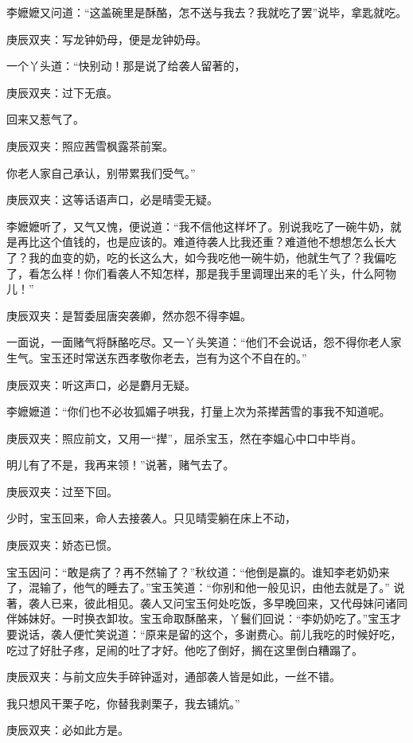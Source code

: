 \begin{parag}
    李嬷嬷又问道：“这盖碗里是酥酪，怎不送与我去？我就吃了罢”说毕，拿匙就吃。\begin{note}庚辰双夹：写龙钟奶母，便是龙钟奶母。\end{note}一个丫头道：“快别动！那是说了给袭人留著的，\begin{note}庚辰双夹：过下无痕。\end{note}回来又惹气了。\begin{note}庚辰双夹：照应茜雪枫露茶前案。\end{note}你老人家自己承认，别带累我们受气。”\begin{note}庚辰双夹：这等话语声口，必是晴雯无疑。\end{note}李嬷嬷听了，又气又愧，便说道：“我不信他这样坏了。别说我吃了一碗牛奶，就是再比这个值钱的，也是应该的。难道待袭人比我还重？难道他不想想怎么长大了？我的血变的奶，吃的长这么大，如今我吃他一碗牛奶，他就生气了？我偏吃了，看怎么样！你们看袭人不知怎样，那是我手里调理出来的毛丫头，什么阿物儿！”\begin{note}庚辰双夹：是暂委屈唐突袭卿，然亦怨不得李媪。\end{note}一面说，一面赌气将酥酪吃尽。又一丫头笑道：“他们不会说话，怨不得你老人家生气。宝玉还时常送东西孝敬你老去，岂有为这个不自在的。”\begin{note}庚辰双夹：听这声口，必是麝月无疑。\end{note}李嬷嬷道：“你们也不必妆狐媚子哄我，打量上次为茶撵茜雪的事我不知道呢。\begin{note}庚辰双夹：照应前文，又用一“撵”，屈杀宝玉，然在李媪心中口中毕肖。\end{note}明儿有了不是，我再来领！”说著，赌气去了。\begin{note}庚辰双夹：过至下回。\end{note}
\end{parag}


\begin{parag}
    少时，宝玉回来，命人去接袭人。只见晴雯躺在床上不动，\begin{note}庚辰双夹：娇态已惯。\end{note}宝玉因问：“敢是病了？再不然输了？”秋纹道：“他倒是赢的。谁知李老奶奶来了，混输了，他气的睡去了。”宝玉笑道：“你别和他一般见识，由他去就是了。” 说著，袭人已来，彼此相见。袭人又问宝玉何处吃饭，多早晚回来，又代母妹问诸同伴姊妹好。一时换衣卸妆。宝玉命取酥酪来，丫鬟们回说：“李奶奶吃了。”宝玉才要说话，袭人便忙笑说道：“原来是留的这个，多谢费心。前儿我吃的时候好吃，吃过了好肚子疼，足闹的吐了才好。他吃了倒好，搁在这里倒白糟蹋了。\begin{note}庚辰双夹：与前文应失手碎钟遥对，通部袭人皆是如此，一丝不错。\end{note}我只想风干栗子吃，你替我剥栗子，我去铺炕。”\begin{note}庚辰双夹：必如此方是。\end{note}
\end{parag}


